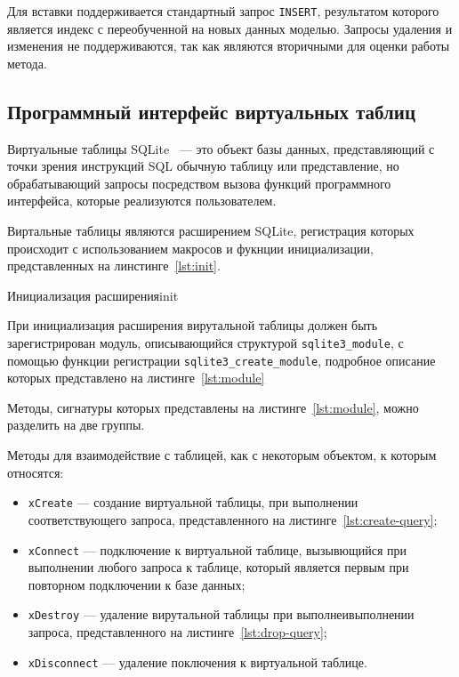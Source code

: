 Для вставки поддерживается стандартный запрос \texttt{INSERT}, результатом
которого является индекс с переобученной на новых данных моделью. Запросы
удаления и изменения не поддерживаются, так как являются вторичными для оценки
работы метода.

\subsection{Программный интерфейс виртуальных таблиц}

Виртуальные таблицы SQLite~\cite{vtable} --- это объект базы данных,
представляющий с точки зрения инструкций SQL обычную таблицу или представление,
но обрабатывающий запросы посредством вызова функций программного интерфейса,
которые реализуются пользователем.

Виртальные таблицы являются расширением SQLite, регистрация которых происходит с
использованием макросов и фукнции инициализации, представленных на
линстинге~\ref{lst:init}.

{}{Инициализация расширения}{init}{}

При инициализация расширения вирутальной таблицы должен быть зарегистрирован
модуль, описывающийся структурой \texttt{sqlite3\_module}, с помощью функции
регистрации \texttt{sqlite3\_create\_module}, подробное описание которых
представлено на листинге~\ref{lst:module}


Методы, сигнатуры которых представлены на листинге~\ref{lst:module}, можно
разделить на две группы.

Методы для взаимодействие с таблицей, как с некоторым объектом, к которым
относятся:
\begin{itemize}
    \item \texttt{xCreate} --- создание виртуальной таблицы, при
        выполнении соответствующего запроса, представленного на
        листинге~\ref{lst:create-query};
    \item \texttt{xConnect} --- подключение к виртуальной таблице,
        вызывющийся при выполнении любого запроса к таблице, который
        является первым при повторном подключении к базе данных;
    \item \texttt{xDestroy} --- удаление вирутальной таблицы при
        выполнеивыполнении запроса, представленного на
        листинге~\ref{lst:drop-query};
    \item \texttt{xDisconnect} --- удаление поключения к виртуальной
        таблице.
\end{itemize}

